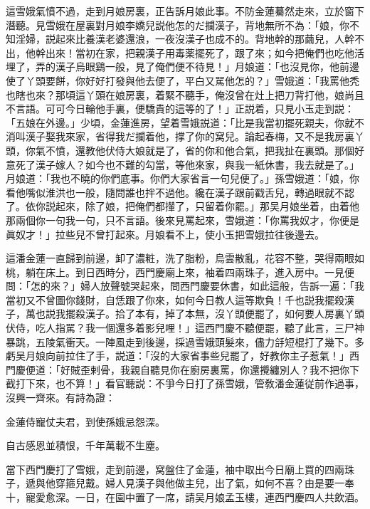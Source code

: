 這雪娥氣憤不過，走到月娘房裏，正告訴月娘此事。不防金蓮驀然走來，立於窗下潛聽。見雪娥在屋裏對月娘李嬌兒説他怎的だ攔漢子，背地無所不為：「娘，你不知淫婦，説起來比養漢老婆還浪，一夜沒漢子也成不的。背地幹的那繭兒，人幹不出，他幹出來！當初在家，把親漢子用毒薬擺死了，跟了來；如今把俺們也吃他活埋了，弄的漢子烏眼鷄一般，見了俺們便不待見！」月娘道：「也沒見你，他前邊使了丫頭要餅，你好好打發與他去便了，平白又駡他怎的？」雪娥道：「我罵他秃也瞎也來？那頃這丫頭在娘房裏，着緊不聽手，俺沒曾在灶上把刀背打他，娘尚且不言語。可可今日輪他手裏，便驕貴的這等的了！」正説着，只見小玉走到説：「五娘在外邊。」少頃，金蓮進房，望着雪娥説道：「比是我當初擺死親夫，你就不消叫漢子娶我來家，省得我だ攔着他，撑了你的窝兒。論起春梅，又不是我房裏丫頭，你氣不憤，還教他伏侍大娘就是了，省的你和他合氣，把我扯在裏頭。那個好意死了漢子嫁人？如今也不難的勾當，等他來家，與我一紙休書，我去就是了。」月娘道：「我也不曉的你們底事。你們大家省言一句兒便了。」孫雪娥道：「娘，你看他嘴似淮洪也一般，隨問誰也拌不過他。纔在漢子跟前戳舌兒，轉過眼就不認了。依你説起來，除了娘，把俺們都攆了，只留着你罷。」那吴月娘坐着，由着他那兩個你一句我一句，只不言語。後來見罵起來，雪娥道：「你罵我奴才，你便是眞奴才！」拉些兒不曾打起來。月娘看不上，使小玉把雪娥拉往後邊去。

這潘金蓮一直歸到前邊，卸了濃粧，洗了脂粉，烏雲散亂，花容不整，哭得兩眼如桃，躺在床上。到日西時分，西門慶廟上來，袖着四兩珠子，進入房中。一見便問：「怎的來？」婦人放聲號哭起來，問西門慶要休書，如此這般，告訴一遍：「我當初又不曾圖你錢財，自恁跟了你來，如何今日教人這等欺負！千也説我擺殺漢子，萬也説我擺殺漢子。拾了本有，掉了本無，沒丫頭便罷了，如何要人房裏丫頭伏侍，吃人指駡？我一個還多着影兒哩！」這西門慶不聽便罷，聽了此言，三尸神暴跳，五陵氣衝天。一陣風走到後邊，採過雪娥頭髮來，儘力㧱短棍打了幾下。多虧吴月娘向前拉住了手，説道：「沒的大家省事些兒罷了，好教你主子惹氣！」西門慶便道：「好賊歪剌骨，我親自聽見你在廚房裏罵，你還攪纏別人？我不把你下截打下來，也不算！」看官聽説：不爭今日打了孫雪娥，管敎潘金蓮従前作過事，沒興一齊來。有詩為證：
\begin{myquote}
金蓮侍寵仗夫君，到使孫娥忌怨深。

自古感恩並積恨，千年萬載不生塵。
\end{myquote}

當下西門慶打了雪娥，走到前邊，窝盤住了金蓮，袖中取出今日廟上買的四兩珠子，遞與他穿箍兒戴。婦人見漢子與他做主兒，出了氣，如何不喜？由是要一奉十，寵愛愈深。一日，在園中置了一席，請吴月娘孟玉樓，連西門慶四人共飲酒。

